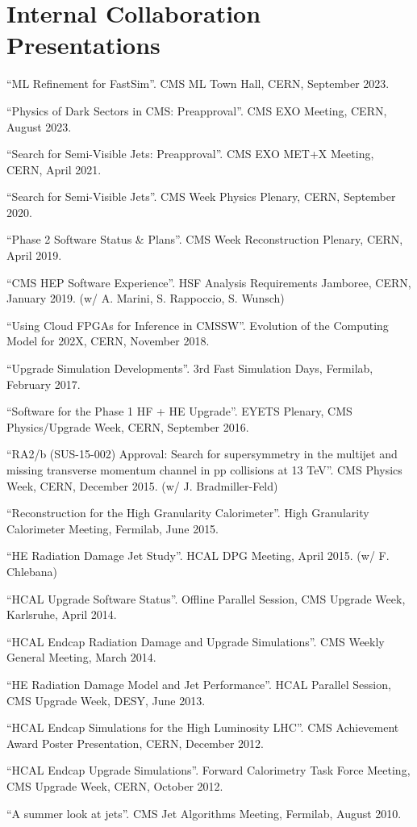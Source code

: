 \section{Internal Collaboration Presentations}
\begin{nbdescription}[leftmargin=12pt,font=\normalfont,labelsep=0em]
\item ``ML Refinement for FastSim''. CMS ML Town Hall, CERN, September 2023.
\item ``Physics of Dark Sectors in CMS: Preapproval''. CMS EXO Meeting, CERN, August 2023.
\item ``Search for Semi-Visible Jets: Preapproval''. CMS EXO MET+X Meeting, CERN, April 2021.
\item ``Search for Semi-Visible Jets''. CMS Week Physics Plenary, CERN, September 2020.
\item ``Phase 2 Software Status \& Plans''. CMS Week Reconstruction Plenary, CERN, April 2019.
\item ``CMS HEP Software Experience''. HSF Analysis Requirements Jamboree, CERN, January 2019. (w/ A. Marini, S. Rappoccio, S. Wunsch)
\item ``Using Cloud FPGAs for Inference in CMSSW''. Evolution of the Computing Model for 202X, CERN, November 2018.
\item ``Upgrade Simulation Developments''. 3rd Fast Simulation Days, Fermilab, February 2017.
\item ``Software for the Phase 1 HF + HE Upgrade''. EYETS Plenary, CMS Physics/Upgrade Week, CERN, September 2016.
\item ``RA2/b (SUS-15-002) Approval: Search for supersymmetry in the multijet and missing transverse momentum channel in pp collisions at 13 TeV''. CMS Physics Week, CERN, December 2015. (w/ J. Bradmiller-Feld)
\item ``Reconstruction for the High Granularity Calorimeter''. High Granularity Calorimeter Meeting, Fermilab, June 2015.
\item ``HE Radiation Damage Jet Study''. HCAL DPG Meeting, April 2015. (w/ F. Chlebana)
\item ``HCAL Upgrade Software Status''. Offline Parallel Session, CMS Upgrade Week, Karlsruhe, April 2014.
\item ``HCAL Endcap Radiation Damage and Upgrade Simulations''. CMS Weekly General Meeting, March 2014.
\item ``HE Radiation Damage Model and Jet Performance''. HCAL Parallel Session, CMS Upgrade Week, DESY, June 2013.
\item ``HCAL Endcap Simulations for the High Luminosity LHC''. CMS Achievement Award Poster Presentation, CERN, December 2012.
\item ``HCAL Endcap Upgrade Simulations''. Forward Calorimetry Task Force Meeting, CMS Upgrade Week, CERN, October 2012.
\item ``A summer look at jets''. CMS Jet Algorithms Meeting, Fermilab, August 2010.
\end{nbdescription}
\fi
